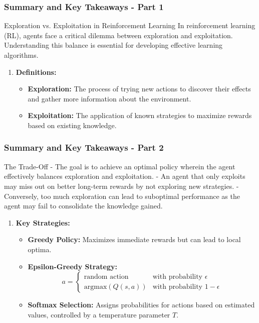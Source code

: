 \documentclass[aspectratio=169]{beamer}
\begin{document}
\begin{frame}[fragile]
    \frametitle{Summary and Key Takeaways - Part 1}
    \begin{block}{Exploration vs. Exploitation in Reinforcement Learning}
        In reinforcement learning (RL), agents face a critical dilemma between exploration and exploitation. Understanding this balance is essential for developing effective learning algorithms.
    \end{block}

    \begin{enumerate}
        \item \textbf{Definitions:}
        \begin{itemize}
            \item \textbf{Exploration:} The process of trying new actions to discover their effects and gather more information about the environment.
            \item \textbf{Exploitation:} The application of known strategies to maximize rewards based on existing knowledge.
        \end{itemize}
    \end{enumerate}
\end{frame}

\begin{frame}[fragile]
    \frametitle{Summary and Key Takeaways - Part 2}
    \begin{block}{The Trade-Off}
        - The goal is to achieve an optimal policy wherein the agent effectively balances exploration and exploitation.
        - An agent that only exploits may miss out on better long-term rewards by not exploring new strategies.
        - Conversely, too much exploration can lead to suboptimal performance as the agent may fail to consolidate the knowledge gained.
    \end{block}

    \begin{enumerate}
        \item \textbf{Key Strategies:}
        \begin{itemize}
            \item \textbf{Greedy Policy:} Maximizes immediate rewards but can lead to local optima.
            \item \textbf{Epsilon-Greedy Strategy:} 
            \begin{equation}
                a = 
                \begin{cases} 
                \text{random action} & \text{with probability } \epsilon \\ 
                \text{argmax}(Q(s, a)) & \text{with probability } 1 - \epsilon 
                \end{cases}
            \end{equation}
            \item \textbf{Softmax Selection:} Assigns probabilities for actions based on estimated values, controlled by a temperature parameter \( T \).
        \end{itemize}
    \end{enumerate}
\end{frame}
\end{document}

